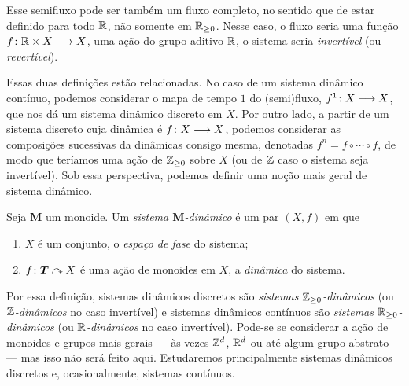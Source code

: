 Esse semifluxo pode ser também um fluxo completo, no sentido que de estar definido para todo $\mathbb{R}$, não somente em $\mathbb{R}_{\geq 0}$. Nesse caso, o fluxo seria uma função ${f}\colon {\mathbb{R}\times X} \longrightarrow {X}$, uma ação do grupo aditivo $\mathbb{R}$, o sistema seria \emph{invertível} (ou \emph{revertível}).

Essas duas definições estão relacionadas. No caso de um sistema dinâmico contínuo, podemos considerar o mapa de tempo $1$ do (semi)fluxo, ${f^1}\colon {X} \longrightarrow {X}$, que nos dá um sistema dinâmico discreto em $X$. Por outro lado, a partir de um sistema discreto cuja dinâmica é ${f}\colon {X} \longrightarrow {X}$, podemos considerar as composições sucessivas da dinâmicas consigo mesma, denotadas $f^n = f \circ \cdots \circ f$, de modo que teríamos uma ação de $\mathbb{Z}_{\geq 0}$ sobre $X$ (ou de $\mathbb{Z}$ caso o sistema seja invertível). Sob essa perspectiva, podemos definir uma noção mais geral de sistema dinâmico.

\begin{definition}
Seja $\bm M$ um monoide. Um \emph{sistema $\bm M$-dinâmico} é um par $(X,f)$ em que
	\begin{enumerate}
	\item $X$ é um conjunto, o \emph{espaço de fase} do sistema;
	\item $f\colon \bm T \curvearrowright X$ é uma ação de monoides em $X$, a \emph{dinâmica} do sistema.
	\end{enumerate}
\end{definition}

\begin{comment}
\begin{definition}
Um \emph{sistema dinâmico} é uma tripla $\Sist=(X,\bm T,f)$ em que
\begin{enumerate}
\item $X$ é um conjunto, o \emph{espaço de fase} do sistema;
\item $\bm T$ é um monoide, o \emph{espaço temporal} do sistema;
\item $f\colon \bm T \age X$ é uma ação de monoides em $X$, a \emph{dinâmica} do sistema.
\end{enumerate}
\end{definition}
\end{comment}

Por essa definição, sistemas dinâmicos discretos são \emph{sistemas $\mathbb{Z}_{\geq 0}$-dinâmicos} (ou \emph{$\mathbb{Z}$-dinâmicos} no caso invertível) e sistemas dinâmicos contínuos são \emph{sistemas $\mathbb{R}_{\geq 0}$-dinâmicos} (ou \emph{$\mathbb{R}$-dinâmicos} no caso invertível). Pode-se se considerar a ação de monoides e grupos mais gerais --- às vezes $\mathbb{Z}^d$, $\mathbb{R}^d$ ou até algum grupo abstrato --- mas isso não será feito aqui. Estudaremos principalmente sistemas dinâmicos discretos e, ocasionalmente, sistemas contínuos.

